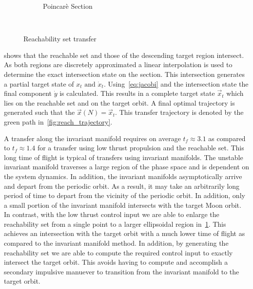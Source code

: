 \documentclass[preprint]{elsarticle}
\begin{document}
\begin{figure}
\begin{subfigure}[htbp]{0.5\textwidth}
		\caption{Poincar\`e Section} \label{fig:poincare_compare} 
	\end{subfigure} ~ %
	\caption{Reachability set transfer}
	\label{fig:reachability_set_transfer} 
\end{figure}

 shows that the reachable set and those of the descending target region intersect.
As both regions are discretely approximated a linear interpolation is used to determine the exact intersection state on the \Poincare section.
This intersection generates a partial target state of \( x_t \text{ and } \dot{x}_t \).
Using~\cref{eq:jacobi} and the intersection state the final component \( \dot{y} \) is calculated. 
This results in a complete target state \( \vec{x}_t \) which lies on the reachable set and on the target orbit. 
A final optimal trajectory is generated such that the \( \vec{x}(N) = \vec{x}_t \).
This transfer trajectory is denoted by the green path in~\cref{fig:reach_trajectory}.

A transfer along the invariant manifold requires on average \( t_f \approx 3.1 \) as compared to \( t_f \approx 1.4 \) for a transfer using low thrust propulsion and the reachable set.
This long time of flight is typical of transfers using invariant manifolds.
The unstable invariant manifold traverses a large region of the phase space and is dependent on the system dynamics. 
In addition, the invariant manifolds asymptotically arrive and depart from the periodic orbit. 
As a result, it may take an arbitrarily long period of time to depart from the vicinity of the periodic orbit.
In addition, only a small portion of the invariant manifold intersects with the target Moon orbit.
In contrast, with the low thrust control input we are able to enlarge the reachability set from a single point to a larger ellipsoidal region in~\cref{fig:poincare_compare}.
This achieves an intersection with the target orbit with a much lower time of flight as compared to the invariant manifold method.
In addition, by generating the reachability set we are able to compute the required control input to exactly intersect the target orbit.
This avoids having to compute and accomplish a secondary impulsive manuever to transition from the invariant manifold to the target orbit.
\end{document}
